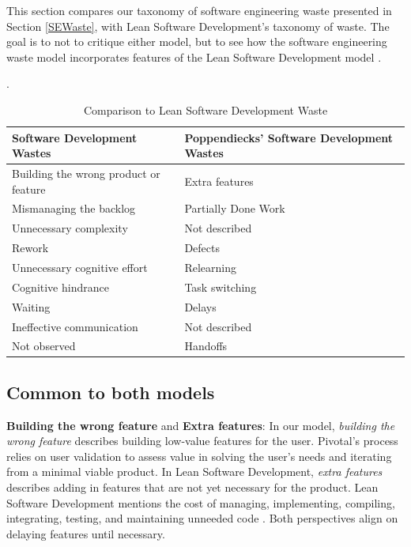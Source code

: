 This section compares our taxonomy of software engineering waste presented in Section \ref{SEWaste}, with Lean Software Development's taxonomy of waste. The goal is to not to critique either model, but to see how the software engineering waste model incorporates features of the Lean Software Development model \cite{PoppendieckConceptToCash}. 

 \cite{GlaserTheoreticalSensitivity}. 


\begin{table}[t]
\renewcommand{\arraystretch}{1.5}
\centering
\caption{Comparison to Lean Software Development Waste}
\label{LeanSoftwareDevelopmentComparison}
\begin{tabular}{|l|l|}
\hline
Software Development Wastes           & Poppendiecks' Software Development Wastes \\ \hline
Building the wrong product or feature & Extra features                            \\ \hline
Mismanaging the backlog               & Partially Done Work                            \\ \hline
Unnecessary complexity                & Not described                             \\ \hline
Rework                                & Defects                                   \\ \hline
Unnecessary cognitive effort          & Relearning                             \\ \hline
Cognitive hindrance           & Task switching                             \\ \hline
Waiting                               & Delays                                    \\ \hline
Ineffective communication             & Not described                             \\ \hline
Not observed                          & Handoffs                                  \\ \hline
\end{tabular}
\end{table}
\subsection{Common to both models}
\textbf{Building the wrong feature} and \textbf{Extra features}: In our model, \textit{building the wrong feature} describes building low-value features for the user. Pivotal's process relies on user validation to assess value in solving the user's needs and iterating from a minimal viable product. In Lean Software Development, \textit{extra features} describes adding in features that are not yet necessary for the product. Lean Software Development mentions the cost of managing, implementing, compiling, integrating, testing, and maintaining unneeded code \cite{PoppendieckLeanSoftwareDevelopment}.  Both perspectives align on delaying features until necessary. 

